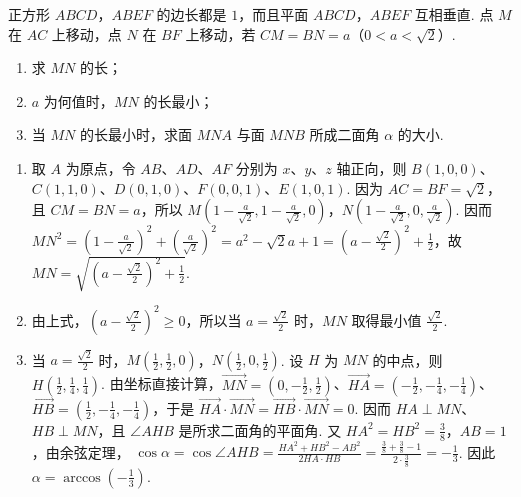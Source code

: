 \begin{problem}
正方形 \(ABCD\)，\(ABEF\) 的边长都是 \(1\)，而且平面 \(ABCD\)，\(ABEF\) 互相垂直. 点 \(M\) 在 \(AC\) 上移动，点 \(N\) 在 \(BF\) 上移动，若 \(CM = BN = a\)（\(0 < a < \sqrt{2}\)）.

\begin{enumerate}
\item 求 \(MN\) 的长；
\item \(a\) 为何值时，\(MN\) 的长最小；
\item 当 \(MN\) 的长最小时，求面 \(MNA\) 与面 \(MNB\) 所成二面角 \(\alpha\) 的大小.
\end{enumerate}
\end{problem}

\begin{solution}
\begin{enumerate}
\item 取 \(A\) 为原点，令 \(AB\)、\(AD\)、\(AF\) 分别为 \(x\)、\(y\)、\(z\) 轴正向，则 \(B(1,0,0)\)、\(C(1,1,0)\)、\(D(0,1,0)\)、\(F(0,0,1)\)、\(E(1,0,1)\). 因为 \(AC=BF=\sqrt2\)，且 \(CM=BN=a\)，所以 \(\displaystyle M\left(1-\frac{a}{\sqrt2},1-\frac{a}{\sqrt2},0\right)\)，\(\displaystyle N\left(1-\frac{a}{\sqrt2},0,\frac{a}{\sqrt2}\right)\). 因而
\(\displaystyle MN^2=\left(1-\frac{a}{\sqrt2}\right)^2+\left(\frac{a}{\sqrt2}\right)^2=a^2-\sqrt2a+1=\left(a-\frac{\sqrt2}{2}\right)^2+\frac12\)，故 \(\displaystyle MN=\sqrt{\left(a-\frac{\sqrt2}{2}\right)^2+\frac12}\).
\item 由上式，\(\displaystyle\left(a-\frac{\sqrt2}{2}\right)^2\geqslant0\)，所以当 \(\displaystyle a=\frac{\sqrt2}{2}\) 时，\(MN\) 取得最小值 \(\displaystyle\frac{\sqrt2}{2}\).
\item 当 \(\displaystyle a=\frac{\sqrt2}{2}\) 时，\(M\left(\frac12,\frac12,0\right)\)，\(N\left(\frac12,0,\frac12\right)\). 设 \(H\) 为 \(MN\) 的中点，则 \(H\left(\frac12,\frac14,\frac14\right)\). 由坐标直接计算，\(\overrightarrow{MN}=(0,-\frac12,\frac12)\)、\(\overrightarrow{HA}=(-\frac12,-\frac14,-\frac14)\)、\(\overrightarrow{HB}=(\frac12,-\frac14,-\frac14)\)，于是 \(\overrightarrow{HA}\cdot\overrightarrow{MN}=\overrightarrow{HB}\cdot\overrightarrow{MN}=0\). 因而 \(HA\perp MN\)、\(HB\perp MN\)，且 \(\angle AHB\) 是所求二面角的平面角. 又 \(\displaystyle HA^2=HB^2=\frac38\)，\(AB=1\)，由余弦定理，
\(\displaystyle\cos\alpha=\cos\angle AHB=\frac{HA^2+HB^2-AB^2}{2HA\cdot HB}=\frac{\frac38+\frac38-1}{2\cdot\frac38}=-\frac13\). 因此 \(\displaystyle\alpha=\arccos\left(-\frac13\right)\).
\end{enumerate}
\end{solution}

